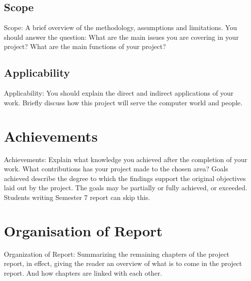 \subsection{Scope}
Scope: A brief overview of the methodology, assumptions and limitations. You should answer the question: What are the main issues you are covering in your project? What are the main functions of your project?

\subsection{Applicability}
Applicability: You should explain the direct and indirect applications of your work. Briefly discuss how this project will serve the computer world and people.

\section{Achievements}
Achievements: Explain what knowledge you achieved after the completion of your work. What contributions has your project made to the chosen area? Goals achieved describe the degree to which the findings support the original objectives laid out by the project. The goals may be partially or fully achieved, or exceeded. Students writing Semester 7 report can skip this.

\section{Organisation of Report}
Organization of Report: Summarizing the remaining chapters of the project report, in effect, giving the reader an overview of what is to come in the project report. And how chapters are linked with each other.
